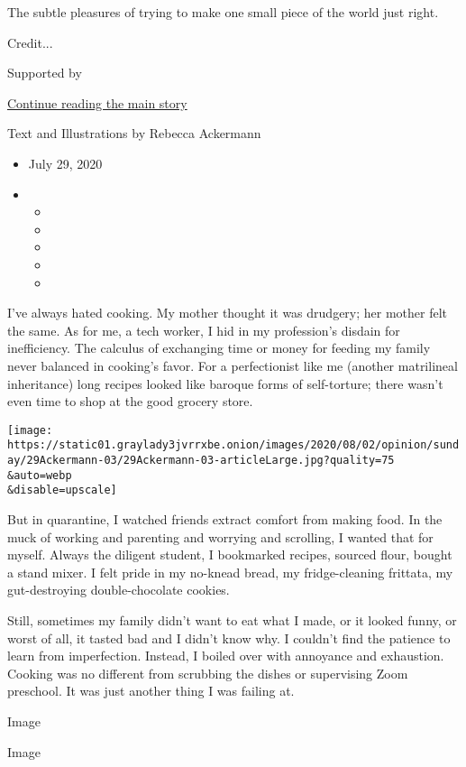 The subtle pleasures of trying to make one small piece of the world just
right.

Credit...

Supported by

\protect\hyperlink{after-sponsor}{Continue reading the main story}

Text and Illustrations by Rebecca Ackermann

\begin{itemize}
\item
  July 29, 2020
\item
  \begin{itemize}
  \item
  \item
  \item
  \item
  \item
  \end{itemize}
\end{itemize}

I've always hated cooking. My mother thought it was drudgery; her mother
felt the same. As for me, a tech worker, I hid in my profession's
disdain for inefficiency. The calculus of exchanging time or money for
feeding my family never balanced in cooking's favor. For a perfectionist
like me (another matrilineal inheritance) long recipes looked like
baroque forms of self-torture; there wasn't even time to shop at the
good grocery store.

\texttt{[image: https://static01.graylady3jvrrxbe.onion/images/2020/08/02/opinion/sunday/29Ackermann-03/29Ackermann-03-articleLarge.jpg?quality=75\\\&auto=webp\\\&disable=upscale]}

But in quarantine, I watched friends extract comfort from making food.
In the muck of working and parenting and worrying and scrolling, I
wanted that for myself. Always the diligent student, I bookmarked
recipes, sourced flour, bought a stand mixer. I felt pride in my
no-knead bread, my fridge-cleaning frittata, my gut-destroying
double-chocolate cookies.

Still, sometimes my family didn't want to eat what I made, or it looked
funny, or worst of all, it tasted bad and I didn't know why. I couldn't
find the patience to learn from imperfection. Instead, I boiled over
with annoyance and exhaustion. Cooking was no different from scrubbing
the dishes or supervising Zoom preschool. It was just another thing I
was failing at.

Image

Image

